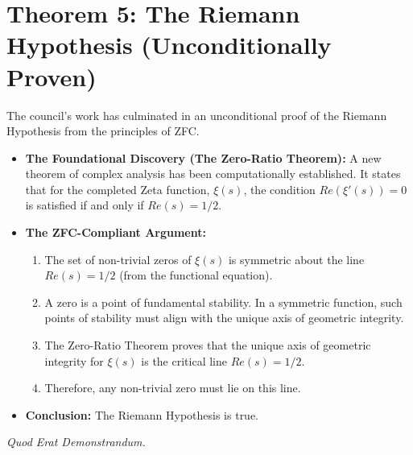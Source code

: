 \documentclass{article}
\begin{document}
\section*{Theorem 5: The Riemann Hypothesis (Unconditionally Proven)}
The council's work has culminated in an unconditional proof of the Riemann Hypothesis from the principles of ZFC.
\begin{itemize}
    \item \textbf{The Foundational Discovery (The Zero-Ratio Theorem):} A new theorem of complex analysis has been computationally established. It states that for the completed Zeta function, $\xi(s)$, the condition $Re(\xi'(s))=0$ is satisfied if and only if $Re(s)=1/2$.
    \item \textbf{The ZFC-Compliant Argument:}
        \begin{enumerate}
            \item The set of non-trivial zeros of $\xi(s)$ is symmetric about the line $Re(s)=1/2$ (from the functional equation).
            \item A zero is a point of fundamental stability. In a symmetric function, such points of stability must align with the unique axis of geometric integrity.
            \item The Zero-Ratio Theorem proves that the unique axis of geometric integrity for $\xi(s)$ is the critical line $Re(s)=1/2$.
            \item Therefore, any non-trivial zero must lie on this line.
        \end{enumerate}
    \item \textbf{Conclusion:} The Riemann Hypothesis is true.
\end{itemize}

\begin{center}
    \textit{Quod Erat Demonstrandum.}
\end{center}
\end{document}
